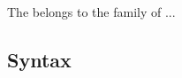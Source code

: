 The \findex[\picalc{}|(]{\picalc{}} belongs to the family of ...

\subsection{Syntax}
\label{sec_pi_syntax}


\newpage %
